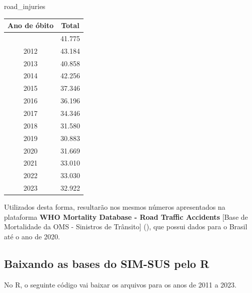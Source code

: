 \documentclass[
]{article}
\newenvironment{Shaded}{\begin{snugshade}}{\end{snugshade}}
\newcommand{\NormalTok}[1]{#1}
\begin{document}
\begin{Shaded}
\begin{Highlighting}[]
\NormalTok{road\_injuries}
\end{Highlighting}
\end{Shaded}

\begin{longtable}[]{@{}cc@{}}
\toprule\noalign{}
Ano de óbito & Total \\
\midrule\noalign{}
\endhead
\bottomrule\noalign{}
\endlastfoot
2011 & 41.775 \\
2012 & 43.184 \\
2013 & 40.858 \\
2014 & 42.256 \\
2015 & 37.346 \\
2016 & 36.196 \\
2017 & 34.346 \\
2018 & 31.580 \\
2019 & 30.883 \\
2020 & 31.669 \\
2021 & 33.010 \\
2022 & 33.030 \\
2023 & 32.922 \\
\end{longtable}

Utilizados desta forma, resultarão nos mesmos números apresentados na
plataforma \textbf{WHO Mortality Database - Road Traffic Accidents}
{[}Base de Mortalidade da OMS - Sinistros de Trânsito{]}
(), que possui dados para o Brasil até
o ano de 2020.

\subsection{Baixando as bases do SIM-SUS pelo
R}\label{baixando-as-bases-do-sim-sus-pelo-r}

No R, o seguinte código vai baixar os arquivos para os anos de 2011 a
2023.
\end{document}
